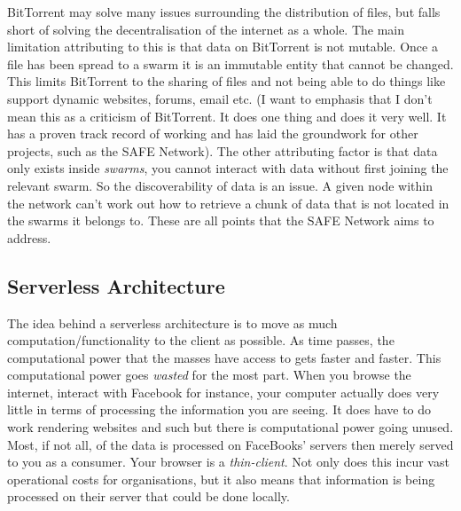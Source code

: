 BitTorrent may solve many issues surrounding the distribution of files, but falls short of solving the decentralisation of the internet as a whole. The main limitation attributing to this is that data on BitTorrent is not mutable. Once a file has been spread to a swarm it is an immutable entity that cannot be changed. This limits BitTorrent to the sharing of files and not being able to do things like support dynamic websites, forums, email etc. (I want to emphasis that I don't mean this as a criticism of BitTorrent. It does one thing and does it very well. It has a proven track record of working and has laid the groundwork for other projects, such as the SAFE Network). The other attributing factor is that data only exists inside \textit{swarms}, you cannot interact with data without first joining the relevant swarm. So the discoverability of data is an issue. A given node within the network can't work out how to retrieve a chunk of data that is not located in the swarms it belongs to. These are all points that the SAFE Network aims to address.

\subsection{Serverless Architecture}

The idea behind a serverless architecture is to move as much computation/functionality to the client as possible. As time passes, the computational power that the masses have access to gets faster and faster. This computational power goes \textit{wasted} for the most part. When you browse the internet, interact with Facebook for instance, your computer actually does very little in terms of processing the information you are seeing. It does have to do work rendering websites and such but there is computational power going unused. Most, if not all, of the data is processed on FaceBooks' servers then merely served to you as a consumer. Your browser is a \textit{thin-client}. Not only does this incur vast operational costs for organisations, but it also means that information is being processed on their server that could be done locally.

